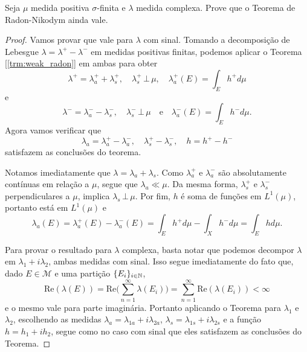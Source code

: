 \begin{problem}
    \label{prob:l6:1}
    Seja $\mu$ medida positiva $\sigma$-finita e $\lambda$ medida complexa. Prove que o Teorema de Radon-Nikodym ainda vale.
\end{problem}
\begin{proof}
    Vamos provar que vale para $\lambda$ com sinal. Tomando a decomposição de Lebesgue $\lambda = \lambda^+ - \lambda^-$ em 
    medidas positivas finitas, podemos aplicar o Teorema [\ref{trm:weak_radon}] em ambas para obter
    $$\lambda^+ = \lambda^+_a + \lambda_{s}^+, \quad \lambda_{s}^+\,\bot\,\mu, \quad \lambda_{a}^+(E) = \int_{E} h^+ d\mu$$
    e
    $$\lambda^- = \lambda^-_a - \lambda_{s}^-, \quad \lambda_{s}^-\,\bot\,\mu \quad \text{e} \quad \lambda_{a}^-(E) = \int_{E} h^- d\mu.$$
    Agora vamos verificar que
    $$\lambda_a = \lambda_a^+ - \lambda_a^-, \quad \lambda_{s}^+ - \lambda_s^- ,\quad h = h^+ - h^-$$
    satisfazem as conclusões do teorema. 
    
    Notamos imediatamente que $\lambda = \lambda_a + \lambda_s$. Como $\lambda_a^+$ e $\lambda_a^-$ são absolutamente contínuas em relação a $\mu$,
    segue que $\lambda_a \ll \mu$. Da mesma forma, $\lambda_s^+$ e $\lambda_s^-$ perpendiculares a $\mu$, implica $\lambda_s \,\bot\, \mu$.
    Por fim, $h$ é soma de funções em $L^1(\mu)$, portanto está em $L^1(\mu)$ e
    $$\lambda_a(E) = \lambda_a^+(E) - \lambda_a^-(E) = \int_E h^+ d\mu - \int_X h^- d\mu = \int_E hd\mu.$$

    Para provar o resultado para $\lambda$ complexa, basta notar que podemos decompor $\lambda$ em $\lambda_1 + i \lambda_2$, 
    ambas medidas com sinal. Isso segue imediatamente do fato que, dado $E \in \mathcal{M}$ e uma partição $\{E_i\}_{i \in \mathbb{N}}$,
    $$\text{Re}(\lambda(E)) = \text{Re}\bigg(\sum_{n=1}^{\infty} \lambda(E_i)\bigg) = \sum_{n=1}^{\infty} \text{Re}(\lambda(E_i)) < \infty$$
    e o mesmo vale para parte imaginária. Portanto aplicando o Teorema para $\lambda_1$ e $\lambda_2$, escolhendo as medidas
    $\lambda_a = \lambda_{1a} + i\lambda_{2a}$, $\lambda_s = \lambda_{1s} + i\lambda_{2s}$ e a função $h = h_1 + ih_2$, segue como no caso
    com sinal que eles satisfazem as conclusões do Teorema.

    
\end{proof}

    
